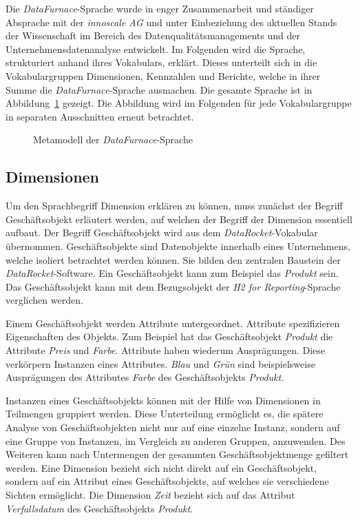 \documentclass[
  language=german, %
  type=bachelor,%
  ngerman
]{isthesis}
\begin{document}
\begin{content}
  Die \textit{DataFurnace}-Sprache wurde in enger Zusammenarbeit und ständiger
  Absprache mit der \textit{innoscale AG} und unter Einbeziehung des
  aktuellen Stands der Wissenschaft im Bereich des Datenqualitätsmanagements und
  der Unternehmensdatenanalyse entwickelt. Im Folgenden wird die Sprache,
  strukturiert anhand ihres Vokabulars, erklärt. Dieses unterteilt sich in die
  Vokabulargruppen Dimensionen, Kennzahlen und Berichte, welche in ihrer Summe
  die \textit{DataFurnace}-Sprache ausmachen. Die gesamte Sprache ist in
  Abbildung~\ref{fig:language_spec-erm} gezeigt. Die Abbildung wird im Folgenden für jede
  Vokabulargruppe in separaten Ausschnitten erneut betrachtet.

  \begin{figure}
    \resizebox{\columnwidth}{!}{}
    \caption{Metamodell der \textit{DataFurnace}-Sprache}\label{fig:language_spec-erm}
  \end{figure}

  \subsection{Dimensionen}\label{subsec:dimension}

	Um den Sprachbegriff Dimension erklären zu können, muss zunächst der Begriff
  Geschäftsobjekt erläutert werden, auf welchen der Begriff der Dimension
	essentiell aufbaut. Der Begriff Geschäftsobjekt wird aus dem
	\textit{DataRocket}-Vokabular übernommen. Geschäftsobjekte sind Datenobjekte
	innerhalb eines Unternehmens, welche isoliert betrachtet werden können. Sie
	bilden den zentralen Baustein der \textit{DataRocket}-Software. Ein
	Geschäftsobjekt kann zum Beispiel das \textit{Produkt} sein.  Das
	Geschäftsobjekt kann mit dem Bezugsobjekt der \textit{H2 for
	Reporting}-Sprache verglichen werden.

  Einem Geschäftsobjekt werden Attribute untergeordnet. Attribute spezifizieren
  Eigenschaften des Objekts. Zum Beispiel hat das Geschäftsobjekt
  \textit{Produkt} die Attribute \textit{Preis} und \textit{Farbe}. Attribute
  haben wiederum Ausprägungen.  Diese verkörpern Instanzen eines Attributes.
  \textit{Blau} und \textit{Grün} sind beispielsweise Ausprägungen des
  Attributes \textit{Farbe} des Geschäftsobjekts \textit{Produkt}.

	Instanzen eines Geschäftsobjekts können mit der Hilfe von Dimensionen in
	Teilmengen gruppiert werden. Diese Unterteilung ermöglicht es, die spätere
	Analyse von Geschäftsobjekten nicht nur auf eine einzelne Instanz, sondern
	auf eine Gruppe von Instanzen, \ggf{} im Vergleich zu anderen Gruppen,
	anzuwenden. Des Weiteren kann nach Untermengen der gesammten
	Geschäftsobjektmenge gefiltert werden.  Eine Dimension bezieht sich nicht
	direkt auf ein Geschäftsobjekt, sondern auf ein Attribut eines
	Geschäftsobjekts, auf welches sie verschiedene Sichten ermöglicht. Die
	Dimension \textit{Zeit} bezieht sich \zB{} auf das Attribut
	\textit{Verfallsdatum} des Geschäftsobjekts \textit{Produkt}. 


\end{content}
\end{document}
